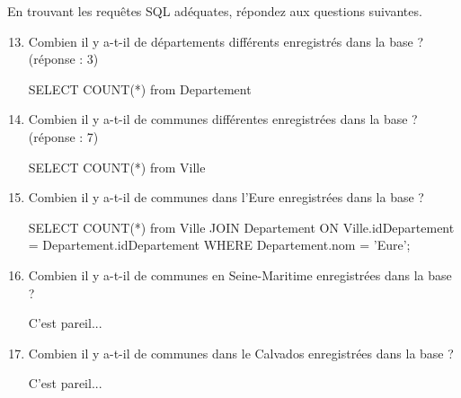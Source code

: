 \documentclass[a4paper,12pt,french]{book}
\begin{document}
En trouvant les requêtes SQL adéquates, répondez aux questions suivantes.

\begin{enumerate}[\bfseries 1.]
	\setcounter{enumi}{12}
\item  Combien il y a-t-il de départements différents enregistrés dans la base ? (réponse : 3)
\begin{sql}
SELECT COUNT(*) from Departement
\end{sql}
\item Combien il y a-t-il de communes différentes enregistrées dans la base ? (réponse : 7)
\begin{sql}
SELECT COUNT(*) from Ville
\end{sql}
\item Combien il y a-t-il de communes dans l’Eure enregistrées dans la base ?
\begin{sql}
SELECT COUNT(*) from Ville
    JOIN Departement ON Ville.idDepartement = Departement.idDepartement
    WHERE Departement.nom = 'Eure';
\end{sql}

\item  Combien il y a-t-il de communes en Seine-Maritime enregistrées dans la base ? 
\begin{corrige}
C'est pareil...
\end{corrige}
\item Combien il y a-t-il de communes dans le Calvados enregistrées dans la base ? 
\begin{corrige}
C'est pareil...
\end{corrige}
\end{enumerate}
\end{document}

